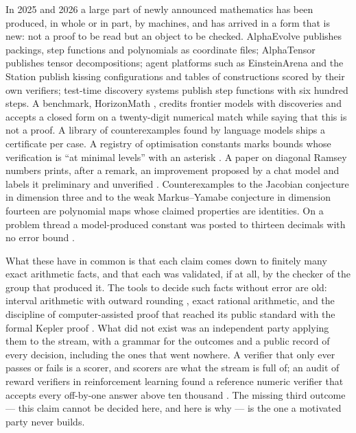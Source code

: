 \documentclass[11pt]{article}
\theoremstyle{plain}
\theoremstyle{definition}
\begin{document}
In 2025 and 2026 a large part of newly announced mathematics has been produced, in whole or in part, by machines, and has arrived in a form that is new: not a proof to be read but an object to be checked. AlphaEvolve \cite{Novikov25,Georgiev25} publishes packings, step functions and polynomials as coordinate files; AlphaTensor \cite{Fawzi22} publishes tensor decompositions; agent platforms such as EinsteinArena \cite{Bianchi26} and the Station \cite{Chung26} publish kissing configurations and tables of constructions scored by their own verifiers; test-time discovery systems \cite{Yuksekgonul26} publish step functions with six hundred steps. A benchmark, HorizonMath \cite{Wang26}, credits frontier models with discoveries and accepts a closed form on a twenty-digit numerical match while saying that this is not a proof. A library of counterexamples found by language models \cite{Sra26} ships a certificate per case. A registry of optimisation constants marks bounds whose verification is ``at minimal levels'' with an asterisk \cite{OptReg}. A paper on diagonal Ramsey numbers prints, after a remark, an improvement proposed by a chat model and labels it preliminary and unverified \cite{GNNW24}. Counterexamples to the Jacobian conjecture in dimension three \cite{Gao26} and to the weak Markus--Yamabe conjecture in dimension fourteen \cite{CHV26} are polynomial maps whose claimed properties are identities. On a problem thread a model-produced constant was posted to thirteen decimals with no error bound \cite{ErdosProblems}.

What these have in common is that each claim comes down to finitely many exact arithmetic facts, and that each was validated, if at all, by the checker of the group that produced it. The tools to decide such facts without error are old: interval arithmetic with outward rounding \cite{MKC09,Tucker11}, exact rational arithmetic, and the discipline of computer-assisted proof that reached its public standard with the formal Kepler proof \cite{Hales17}. What did not exist was an independent party applying them to the stream, with a grammar for the outcomes and a public record of every decision, including the ones that went nowhere. A verifier that only ever passes or fails is a scorer, and scorers are what the stream is full of; an audit of reward verifiers in reinforcement learning found a reference numeric verifier that accepts every off-by-one answer above ten thousand \cite{Xin26}. The missing third outcome --- this claim cannot be decided here, and here is why --- is the one a motivated party never builds.
\end{document}

